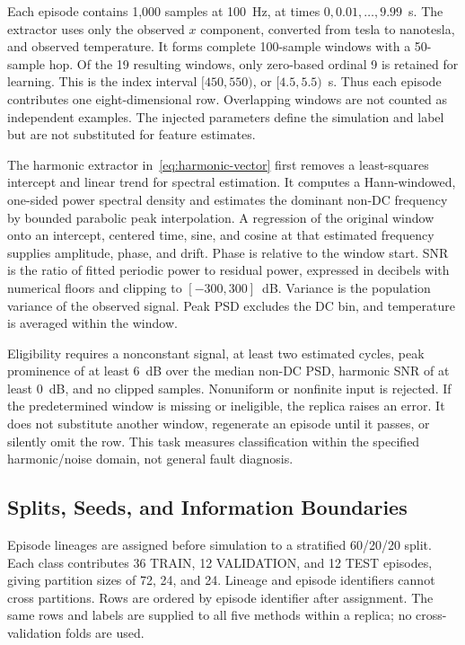 

Each episode contains 1,000 samples at 100~Hz, at times $0,0.01,\ldots,9.99$~s. The extractor uses only the observed $x$ component, converted from tesla to nanotesla, and observed temperature. It forms complete 100-sample windows with a 50-sample hop. Of the 19 resulting windows, only zero-based ordinal 9 is retained for learning. This is the index interval $[450,550)$, or $[4.5,5.5)$~s. Thus each episode contributes one eight-dimensional row. Overlapping windows are not counted as independent examples. The injected parameters define the simulation and label but are not substituted for feature estimates.

The harmonic extractor in~\eqref{eq:harmonic-vector} first removes a least-squares intercept and linear trend for spectral estimation. It computes a Hann-windowed, one-sided power spectral density and estimates the dominant non-DC frequency by bounded parabolic peak interpolation. A regression of the original window onto an intercept, centered time, sine, and cosine at that estimated frequency supplies amplitude, phase, and drift. Phase is relative to the window start. SNR is the ratio of fitted periodic power to residual power, expressed in decibels with numerical floors and clipping to $[-300,300]$~dB. Variance is the population variance of the observed signal. Peak PSD excludes the DC bin, and temperature is averaged within the window.

Eligibility requires a nonconstant signal, at least two estimated cycles, peak prominence of at least 6~dB over the median non-DC PSD, harmonic SNR of at least 0~dB, and no clipped samples. Nonuniform or nonfinite input is rejected. If the predetermined window is missing or ineligible, the replica raises an error. It does not substitute another window, regenerate an episode until it passes, or silently omit the row. This task measures classification within the specified harmonic/noise domain, not general fault diagnosis.

\subsection{Splits, Seeds, and Information Boundaries}
\label{sec:methods-splits}

Episode lineages are assigned before simulation to a stratified 60/20/20 split. Each class contributes 36 TRAIN, 12 VALIDATION, and 12 TEST episodes, giving partition sizes of 72, 24, and 24. Lineage and episode identifiers cannot cross partitions. Rows are ordered by episode identifier after assignment. The same rows and labels are supplied to all five methods within a replica; no cross-validation folds are used.

